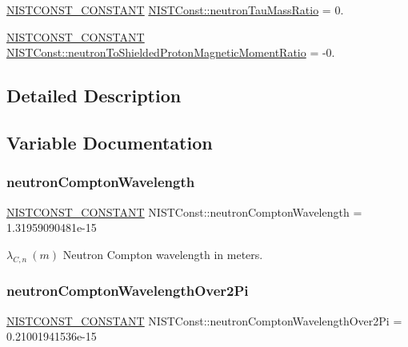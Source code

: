 \begin{DoxyCompactItemize}
\item 
\mbox{\hyperlink{_n_i_s_t_const_8hpp_a2b0fc1d7452373f816175dd86ce26729}{N\+I\+S\+T\+C\+O\+N\+S\+T\+\_\+\+C\+O\+N\+S\+T\+A\+NT}} \mbox{\hyperlink{group___n_i_s_t_const-_neutron_ga0694ef4af94520ba68040847c26b8f7f}{N\+I\+S\+T\+Const\+::neutron\+Tau\+Mass\+Ratio}} = 0.
\item 
\mbox{\hyperlink{_n_i_s_t_const_8hpp_a2b0fc1d7452373f816175dd86ce26729}{N\+I\+S\+T\+C\+O\+N\+S\+T\+\_\+\+C\+O\+N\+S\+T\+A\+NT}} \mbox{\hyperlink{group___n_i_s_t_const-_neutron_gade519a41d92b6d1844a8ff1a24d5438f}{N\+I\+S\+T\+Const\+::neutron\+To\+Shielded\+Proton\+Magnetic\+Moment\+Ratio}} = -\/0.
\end{DoxyCompactItemize}


\subsection{Detailed Description}


\subsection{Variable Documentation}
\mbox{\label{group___n_i_s_t_const-_neutron_gae051f50a8d39fb52c5ce761f9b0696ae}} 
\subsubsection{\texorpdfstring{neutron\+Compton\+Wavelength}{neutronComptonWavelength}}
{\footnotesize\ttfamily \mbox{\hyperlink{_n_i_s_t_const_8hpp_a2b0fc1d7452373f816175dd86ce26729}{N\+I\+S\+T\+C\+O\+N\+S\+T\+\_\+\+C\+O\+N\+S\+T\+A\+NT}} N\+I\+S\+T\+Const\+::neutron\+Compton\+Wavelength = 1.\+31959090481e-\/15}

$\lambda_{C,n} \ (m)$ Neutron Compton wavelength in meters. \mbox{\label{group___n_i_s_t_const-_neutron_gadf551a9e4c9f1c8b81a0b0ffc854d02f}} 
\subsubsection{\texorpdfstring{neutron\+Compton\+Wavelength\+Over2\+Pi}{neutronComptonWavelengthOver2Pi}}
{\footnotesize\ttfamily \mbox{\hyperlink{_n_i_s_t_const_8hpp_a2b0fc1d7452373f816175dd86ce26729}{N\+I\+S\+T\+C\+O\+N\+S\+T\+\_\+\+C\+O\+N\+S\+T\+A\+NT}} N\+I\+S\+T\+Const\+::neutron\+Compton\+Wavelength\+Over2\+Pi = 0.\+21001941536e-\/15}

